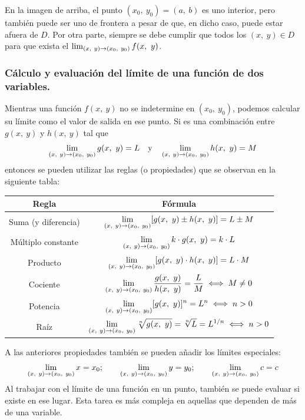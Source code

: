 \documentclass[12pt]{article}
\begin{document}
En la imagen de arriba, el punto $(x_{0}, \ y_{0}) = (a, \ b)$ es uno interior, pero también puede ser uno de frontera a pesar de que, en dicho caso, puede estar afuera de $D$. Por otra parte, siempre se debe cumplir que todos los $(x, \ y) \in D$ para que exista el $\lim_{(x, \ y) \to (x_{0}, \ y_{0})} f(x, \ y)$.

\subsubsection{Cálculo y evaluación del límite de una función de dos variables.}

Mientras una función $f(x, \ y)$ no se indetermine en $(x_{0}, \ y_{0})$, podemos calcular su límite como el valor de salida en ese punto. Si es una combinación entre $g(x, \ y)$ y $h(x, \ y)$ tal que
\[
  \lim_{(x, \ y) \to (x_{0}, \ y_{0})} g(x, \ y) = L
  \quad \text{y} \quad
  \lim_{(x, \ y) \to (x_{0}, \ y_{0})} h(x, \ y) = M
\]
entonces se pueden utilizar las reglas (o propiedades) que se observan en la siguiente tabla:

\begin{table}[hbt!]
\centering

\renewcommand{\arraystretch}{1.5}

\begin{tabular}{c c}
\hline
\textbf{Regla} & \textbf{Fórmula} \\
\hline
Suma (y diferencia) & $\displaystyle \lim_{(x, \ y) \to (x_{0}, \ y_{0})} [g(x, \ y) \pm h(x, \ y)] = L \pm M$ \\
Múltiplo constante & $\displaystyle \lim_{(x, \ y) \to (x_{0}, \ y_{0})} k \cdot g(x, \ y) = k \cdot L$ \\
Producto & $\displaystyle \lim_{(x, \ y) \to (x_{0}, \ y_{0})} [g(x, \ y) \cdot h(x, \ y)] = L \cdot M$ \\
Cociente & $\displaystyle \lim_{(x, \ y) \to (x_{0}, \ y_{0})} \frac{g(x, \ y)}{h(x, \ y)} = \frac{L}{M} \iff M \neq 0$ \\
Potencia & $\displaystyle \lim_{(x, \ y) \to (x_{0}, \ y_{0})} [g(x, \ y)]^{n} = L^{n} \iff n > 0$ \\
Raíz & $\displaystyle \lim_{(x, \ y) \to (x_{0}, \ y_{0})} \sqrt[n]{g(x, \ y)} = \sqrt[n]{L} = L^{1/n} \iff n > 0$ \\
\hline
\end{tabular}

\end{table}

A las anteriores propiedades también se pueden añadir los límites especiales:
\[
  \lim_{(x, \ y) \to (x_{0}, \ y_{0})} x = x_{0}; \qquad
  \lim_{(x, \ y) \to (x_{0}, \ y_{0})} y = y_{0}; \qquad
  \lim_{(x, \ y) \to (x_{0}, \ y_{0})} c = c
\]
Al trabajar con el límite de una función en un punto, también se puede evaluar si existe en ese lugar. Esta tarea es más compleja en aquellas que dependen de más de una variable.
\end{document}
